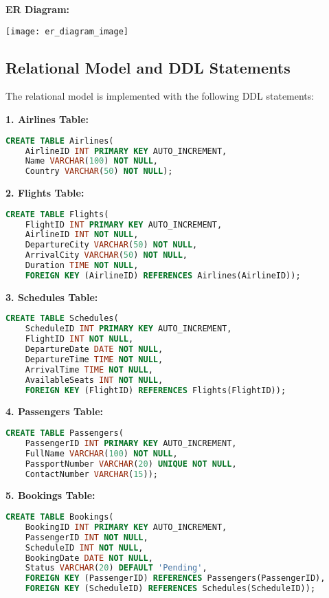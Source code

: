 \documentclass[14pt,a4paper]{extarticle}
\begin{document}
\newpage

\textbf{ER Diagram:}
\begin{center}
\texttt{[image: er\_diagram\_image]}%
\end{center}

\subsection{Relational Model and DDL Statements}
The relational model is implemented with the following DDL statements:

\textbf{1. Airlines Table:}
\begin{lstlisting}[language=SQL]
CREATE TABLE Airlines(
    AirlineID INT PRIMARY KEY AUTO_INCREMENT,
    Name VARCHAR(100) NOT NULL,
    Country VARCHAR(50) NOT NULL);
\end{lstlisting}

\textbf{2. Flights Table:}
\begin{lstlisting}[language=SQL]
CREATE TABLE Flights(
    FlightID INT PRIMARY KEY AUTO_INCREMENT,
    AirlineID INT NOT NULL,
    DepartureCity VARCHAR(50) NOT NULL,
    ArrivalCity VARCHAR(50) NOT NULL,
    Duration TIME NOT NULL,
    FOREIGN KEY (AirlineID) REFERENCES Airlines(AirlineID));
\end{lstlisting}

\textbf{3. Schedules Table:}
\begin{lstlisting}[language=SQL]
CREATE TABLE Schedules(
    ScheduleID INT PRIMARY KEY AUTO_INCREMENT,
    FlightID INT NOT NULL,
    DepartureDate DATE NOT NULL,
    DepartureTime TIME NOT NULL,
    ArrivalTime TIME NOT NULL,
    AvailableSeats INT NOT NULL,
    FOREIGN KEY (FlightID) REFERENCES Flights(FlightID));
\end{lstlisting}

\textbf{4. Passengers Table:}
\begin{lstlisting}[language=SQL]
CREATE TABLE Passengers(
    PassengerID INT PRIMARY KEY AUTO_INCREMENT,
    FullName VARCHAR(100) NOT NULL,
    PassportNumber VARCHAR(20) UNIQUE NOT NULL,
    ContactNumber VARCHAR(15));
\end{lstlisting}

\textbf{5. Bookings Table:}
\begin{lstlisting}[language=SQL]
CREATE TABLE Bookings(
    BookingID INT PRIMARY KEY AUTO_INCREMENT,
    PassengerID INT NOT NULL,
    ScheduleID INT NOT NULL,
    BookingDate DATE NOT NULL,
    Status VARCHAR(20) DEFAULT 'Pending',
    FOREIGN KEY (PassengerID) REFERENCES Passengers(PassengerID),
    FOREIGN KEY (ScheduleID) REFERENCES Schedules(ScheduleID));
\end{lstlisting}
\end{document}
